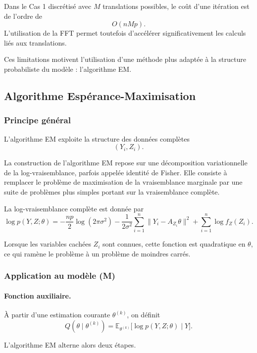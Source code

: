 \documentclass[12pt, a4paper]{article}
\theoremstyle{definition}
\begin{document}
Dans le Cas 1 discrétisé avec $M$ translations possibles, le coût d’une itération est de l’ordre de
\[
O(nMp).
\]
L’utilisation de la FFT permet toutefois d’accélérer significativement les calculs liés aux translations.

Ces limitations motivent l’utilisation d’une méthode plus adaptée à la structure probabiliste du modèle : l’algorithme EM.

\subsection{Algorithme Espérance-Maximisation}
\label{subsec:em}

\subsubsection{Principe général}
\label{subsubsec:em_general}

L’algorithme EM exploite la structure des données complètes
\[
(Y_i,Z_i).
\]

La construction de l’algorithme EM repose sur une décomposition variationnelle de la log-vraisemblance, parfois appelée identité de Fisher. Elle consiste à remplacer le problème de maximisation de la vraisemblance marginale par une suite de problèmes plus simples portant sur la vraisemblance complète.

La log-vraisemblance complète est donnée par
\[
\log p(Y,Z;\theta)
=
-\frac{np}{2}\log(2\pi\sigma^2)
-
\frac{1}{2\sigma^2}
\sum_{i=1}^n
\|Y_i-A_{Z_i}\theta\|^2
+
\sum_{i=1}^n
\log f_Z(Z_i).
\]

Lorsque les variables cachées $Z_i$ sont connues, cette fonction est quadratique en $\theta$, ce qui ramène le problème à un problème de moindres carrés.

\subsubsection{Application au modèle (M)}
\label{subsubsec:em_modele}

\paragraph{Fonction auxiliaire.}

À partir d’une estimation courante $\theta^{(k)}$, on définit
\[
Q(\theta\mid\theta^{(k)})
=
\mathbb E_{\theta^{(k)}}
\bigl[
\log p(Y,Z;\theta)
\mid Y
\bigr].
\]

L’algorithme EM alterne alors deux étapes.
\end{document}
